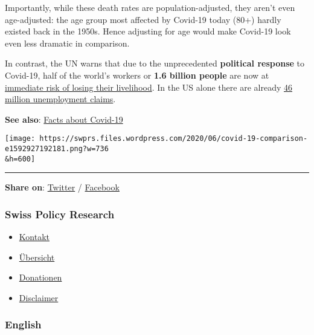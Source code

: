 Importantly, while these death rates are population-adjusted, they
aren't even age-adjusted: the age group most affected by Covid-19 today
(80+) hardly existed back in the 1950s. Hence adjusting for age would
make Covid-19 look even less dramatic in comparison.

In contrast, the UN warns that due to the unprecedented
\textbf{political response} to Covid-19, half of the world's workers or
\textbf{1.6 billion people} are now at
\href{https://www.theguardian.com/world/2020/apr/29/half-of-worlds-workers-at-immediate-risk-of-losing-livelihood-due-to-coronavirus}{immediate
risk of losing their livelihood}. In the US alone there are already
\href{https://www.businessinsider.com/us-weekly-jobless-claims-unemployment-insurance-filings-economy-coronavirus-recession-2020-6}{46
million unemployment claims}.

\textbf{See also}:
\href{https://swprs.org/a-swiss-doctor-on-covid-19/}{Facts about
Covid-19}

\texttt{[image: https://swprs.files.wordpress.com/2020/06/covid-19-comparison-e1592927192181.png?w=736\\\&h=600]}

\begin{center}\rule{0.5\linewidth}{\linethickness}\end{center}

\textbf{Share on}:
\href{https://twitter.com/intent/tweet?url=https://swprs.org/covid19-lethality-how-not-to-do-it/}{Twitter}
/
\href{https://www.facebook.com/share.php?u=https://swprs.org/covid19-lethality-how-not-to-do-it/}{Facebook}

\hypertarget{swiss-policy-research}{%
\subsubsection{Swiss Policy Research}\label{swiss-policy-research}}

\begin{itemize}
\tightlist
\item
  \href{https://swprs.org/kontakt/}{Kontakt}
\item
  \href{https://swprs.org/uebersicht/}{Übersicht}
\item
  \href{https://swprs.org/donationen/}{Donationen}
\item
  \href{https://swprs.org/disclaimer/}{Disclaimer}
\end{itemize}

\hypertarget{english}{%
\subsubsection{English}\label{english}}

